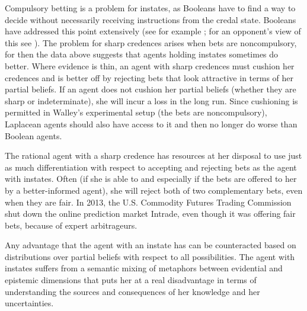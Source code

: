 Compulsory betting is a problem for instates, as
Booleans have to find a way to decide without
necessarily receiving instructions from the credal
state. Booleans have addressed this point extensively
(see for example ; for an
opponent's view of this see ).
The problem for sharp credences arises when bets are
noncompulsory, for then the data above suggests that
agents holding instates sometimes do better. Where
evidence is thin, an agent with sharp credences must
cushion her credences and is better off by rejecting
bets that look attractive in terms of her partial
beliefs. If an agent does not cushion her partial
beliefs (whether they are sharp or indeterminate), she
will incur a loss in the long run. Since cushioning is
permitted in Walley's experimental setup (the bets are
noncompulsory), Laplacean agents should also have
access to it and then no longer do worse than Boolean
agents.

The rational agent with a sharp credence has resources
at her disposal to use just as much differentiation
with respect to accepting and rejecting bets as the
agent with instates. Often (if she is able to and
especially if the bets are offered to her by a
better-informed agent), she will reject both of two
complementary bets, even when they are fair. In 2013,
the U.S. Commodity Futures Trading Commission shut down
the online prediction market Intrade, even though it
was offering fair bets, because of expert arbitrageurs.

Any advantage that the agent with an instate has can be
counteracted based on distributions over partial
beliefs with respect to all possibilities. The agent
with instates suffers from a semantic mixing of
metaphors between evidential and epistemic dimensions
that puts her at a real disadvantage in terms of
understanding the sources and consequences of her
knowledge and her uncertainties.
